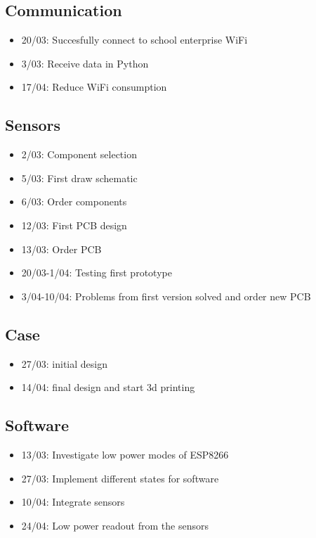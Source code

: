 \documentclass[]{article}
\begin{document}
	\subsection{Communication}
	\begin{itemize}
		\item 20/03: Succesfully connect to school enterprise WiFi
		\item 3/03: Receive data in Python
		\item 17/04: Reduce WiFi consumption
	\end{itemize}

	\subsection{Sensors}
	\begin{itemize}
		\item 2/03: Component selection
		\item 5/03: First draw schematic
		\item 6/03: Order components
		\item 12/03: First PCB design
		\item 13/03: Order PCB
		\item 20/03-1/04: Testing first prototype
		\item 3/04-10/04: Problems from first version solved and order new PCB 
	\end{itemize}

	\subsection{Case}
	\begin{itemize}
		\item 27/03: initial design
		\item 14/04: final design and start 3d printing 
	\end{itemize}
	
	\subsection{Software}
	\begin{itemize}
		\item 13/03: Investigate low power modes of ESP8266
		\item 27/03: Implement different states for software
		\item 10/04: Integrate sensors
		\item 24/04: Low power readout from the sensors
	\end{itemize}
\end{document}
